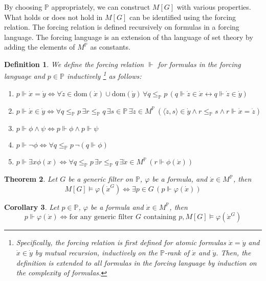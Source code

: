 \documentclass{report}
\newtheorem{thm}{Theorem}[section]
\newtheorem{dfn}[thm]{Definition}
\newtheorem{cor}[thm]{Corollary}
\newcommand{\Pbb}{\mathbb{P}}
\begin{document}
By choosing $\Pbb$ appropriately, we can construct $M[G]$ with various properties.
What holds or does not hold in $M[G]$ can be identified using the forcing relation.
The forcing relation is defined recursively on formulas in a forcing language.
The forcing language is an extension of tha language of set theory by adding the elements of $M^{\Pbb}$ as constants.
\begin{dfn} %
  We define the \emph{forcing relation} $\Vdash$ for formulas in the forcing language and $p \in \Pbb$ inductively
  \footnote{
    Specifically, the forcing relation is first defined for atomic formulas $\dot{x} = \dot{y}$ and $\dot{x} \in \dot{y}$ by mutual recursion,
    inductively on the $\Pbb$-rank of $\dot{x}$ and $\dot{y}$.
    Then, the definition is extended to all formulas in the forcing language by induction on the complexity of formulas.
  }
  as follows:
  \begin{enumerate}
    \item $p \Vdash \dot{x} = \dot{y} \Leftrightarrow \forall \dot{z} \in \mathrm{dom}(\dot{x}) \cup \mathrm{dom}(\dot{y})\,
\forall q \leq_{\Pbb} p \, (q \Vdash \dot{z} \in \dot{x} \leftrightarrow q \Vdash \dot{z} \in \dot{y})$
    \item $p \Vdash \dot{x} \in \dot{y} \Leftrightarrow \forall q \leq_{\Pbb} p\, \exists r \leq_{\Pbb} q \, 
    \exists s \in \Pbb \, \exists \dot{z} \in M^{\Pbb} \, (\langle \dot{z}, s \rangle \in \dot{y} \land r \leq_{\Pbb} s \land r \Vdash \dot{x} = \dot{z} )$
    \item $p \Vdash \phi \land \psi \Leftrightarrow p \Vdash \phi \land p \Vdash \psi$
    \item $p \Vdash \neg \phi \Leftrightarrow \forall q \leq_{\Pbb} p \, \neg (q \Vdash \phi)$
    \item $p \Vdash \exists x \phi(x) \Leftrightarrow \forall q \leq_{\Pbb} p \, \exists r \leq_{\Pbb} q \, \exists \dot{x} \in M^{\Pbb} \, (r \Vdash \phi(\dot{x}))$
  \end{enumerate}
\end{dfn}

\begin{thm}
  Let $G$ be a generic filter on $\Pbb$, $\varphi$ be a formula, and $\dot{x} \in M^{\Pbb}$, then 
  $$M[G] \vDash \varphi(\dot{x}^G) \Leftrightarrow \exists p \in G \, (p \Vdash \varphi(\dot{x}))$$
\end{thm}

\begin{cor}
  Let $p \in \Pbb$, $\varphi$ be a formula and $\dot{x} \in M^{\Pbb}$, then
  $$p \Vdash \varphi(\dot{x}) \Leftrightarrow \text{for any generic filter } G \text{ containing } p, M[G] \vDash \varphi(\dot{x}^G)$$
\end{cor}
\end{document}
